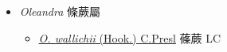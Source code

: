 
  \begin{itemize}
 \item[] \textit{Oleandra} 條蕨屬
                    
  \begin{itemize}
        \item[] \href{http://www.theplantlist.org/tpl1.1/search?q=Oleandra+wallichii}{\textit{O. wallichii} (Hook.) C.Presl}   蓧蕨 LC
  \end{itemize}
  \end{itemize}
